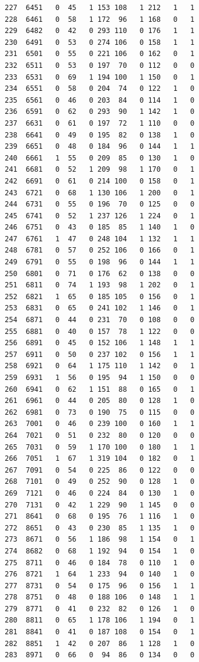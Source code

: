 \documentclass[
  letterpaper,
  DIV=11,
  numbers=noendperiod]{scrreprt}
\begin{document}
\begin{verbatim}
227  6451   0  45   1 153 108   1 212   1   1
228  6461   0  58   1 172  96   1 168   0   1
229  6482   0  42   0 293 110   0 176   1   1
230  6491   0  53   0 274 106   0 158   1   1
231  6501   0  55   0 221 106   0 162   0   1
232  6511   0  53   0 197  70   0 112   0   0
233  6531   0  69   1 194 100   1 150   0   1
234  6551   0  58   0 204  74   0 122   1   0
235  6561   0  46   0 203  84   0 114   1   0
236  6591   0  62   0 293  90   1 142   1   0
237  6631   0  61   0 197  72   1 110   0   0
238  6641   0  49   0 195  82   0 138   1   0
239  6651   0  48   0 184  96   0 144   1   1
240  6661   1  55   0 209  85   0 130   1   0
241  6681   0  52   1 209  98   1 170   0   1
242  6691   0  61   0 214 100   0 158   0   1
243  6721   0  68   1 130 106   1 200   0   1
244  6731   0  55   0 196  70   0 125   0   0
245  6741   0  52   1 237 126   1 224   0   1
246  6751   0  43   0 185  85   1 140   1   0
247  6761   1  47   0 248 104   1 132   1   1
248  6781   0  57   0 252 106   0 166   0   1
249  6791   0  55   0 198  96   0 144   1   1
250  6801   0  71   0 176  62   0 138   0   0
251  6811   0  74   1 193  98   1 202   0   1
252  6821   1  65   0 185 105   0 156   0   1
253  6831   0  65   0 241 102   1 146   0   1
254  6871   0  44   0 231  70   0 108   0   0
255  6881   0  40   0 157  78   1 122   0   0
256  6891   0  45   0 152 106   1 148   1   1
257  6911   0  50   0 237 102   0 156   1   1
258  6921   0  64   1 175 110   1 142   0   1
259  6931   1  56   0 195  94   1 150   0   0
260  6941   0  62   1 151  88   0 165   0   1
261  6961   0  44   0 205  80   0 128   1   0
262  6981   0  73   0 190  75   0 115   0   0
263  7001   0  46   0 239 100   0 160   1   1
264  7021   0  51   0 232  80   0 120   0   0
265  7031   0  59   1 170 100   0 180   1   1
266  7051   1  67   1 319 104   0 182   0   1
267  7091   0  54   0 225  86   0 122   0   0
268  7101   0  49   0 252  90   0 128   1   0
269  7121   0  46   0 224  84   0 130   1   0
270  7131   0  42   1 229  90   1 145   0   0
271  8641   0  68   0 195  76   1 116   1   0
272  8651   0  43   0 230  85   1 135   1   0
273  8671   0  56   1 186  98   1 154   0   1
274  8682   0  68   1 192  94   0 154   1   0
275  8711   0  46   0 184  78   0 110   1   0
276  8721   1  64   1 233  94   0 140   1   0
277  8731   0  54   0 175  96   0 156   1   1
278  8751   0  48   0 188 106   0 148   1   1
279  8771   0  41   0 232  82   0 126   1   0
280  8811   0  65   1 178 106   1 194   0   1
281  8841   0  41   0 187 108   0 154   0   1
282  8851   1  42   0 207  86   1 128   1   0
283  8971   0  66   0  94  86   0 134   0   0

\end{verbatim}
\end{document}
